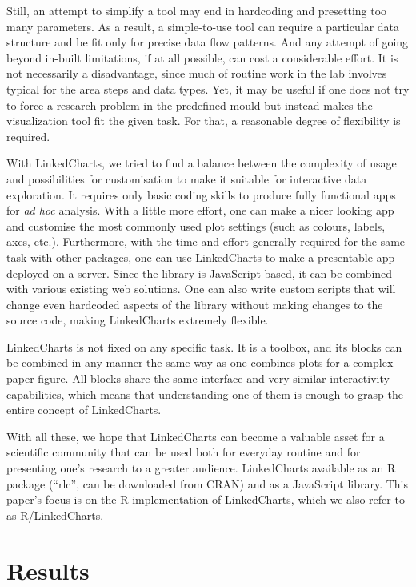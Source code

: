 \documentclass[twocolumn,10pt]{article}
\begin{document}
Still, an attempt to simplify a tool may end in hardcoding and presetting too many parameters. As a result, a simple-to-use tool can require a particular data structure and be fit only for precise data flow patterns. And any attempt of going beyond in-built limitations, if at all possible, can cost a considerable effort. It is not necessarily a disadvantage, since much of routine work in the lab involves typical for the area steps and data types. Yet, it may be useful if one does not try to force a research problem in the predefined mould but instead makes the visualization tool fit the given task. For that, a reasonable degree of flexibility is required.

With LinkedCharts, we tried to find a balance between the complexity of usage and possibilities for customisation to make it suitable for interactive data exploration. It requires only basic coding skills to produce fully functional apps for \emph{ad hoc} analysis. With a little more effort, one can make a nicer looking app and customise the most commonly used plot settings (such as colours, labels, axes, etc.). Furthermore, with the time and effort generally required for the same task with other packages, one can use LinkedCharts to make a presentable app deployed on a server. Since the library is JavaScript-based, it can be combined with various existing web solutions. One can also write custom scripts that will change even hardcoded aspects of the library without making changes to the source code, making LinkedCharts extremely flexible. 

LinkedCharts is not fixed on any specific task. It is a toolbox, and its blocks can be combined in any manner the same way as one combines plots for a complex paper figure. All blocks share the same interface and very similar interactivity capabilities, which means that understanding one of them is enough to grasp the entire concept of LinkedCharts.

With all these, we hope that LinkedCharts can become a valuable asset for a scientific community that can be used both for everyday routine and for presenting one's research to a greater audience. LinkedCharts available as an R package (``rlc'', can be downloaded from CRAN) and as a JavaScript library. This paper's focus is on the R implementation of LinkedCharts, which we also refer to as R/LinkedCharts. 

\section{Results}
\end{document}
